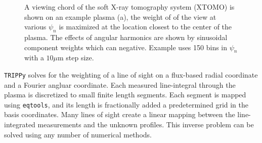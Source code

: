 \documentclass[12pt,floatfix,showpacs]{revtex4-1}
\newcommand{\eqtools}{\texttt{eqtools}\xspace}
\newcommand{\TRIPPy}{\texttt{TRIPPy}\xspace}
\begin{document}
\begin{figure}
	\caption{A viewing chord of the soft X-ray tomography system (XTOMO) is shown on an example plasma (a), the weight of of the view at various $\psi_n$ is maximized at the location closest to the center of the plasma. The effects of angular harmonics are shown by sinusoidal component weights which can negative. Example uses 150 bins in $\psi_n$ with a $10 \mu$m step size.}
	\label{fig:TRIPPydemo}
\end{figure}


\TRIPPy solves for the weighting of a line of sight on a flux-based radial coordinate and a Fourier angluar coordinate.
Each measured line-integral through the plasma is discretized to small finite length segments.
Each segment is mapped using \eqtools, and its length is fractionally added a predetermined grid in the basis coordinates.
Many lines of sight create a linear mapping between the line-integrated measurements and the unknown profiles.
This inverse problem can be solved using any number of numerical methods.
\end{document}
